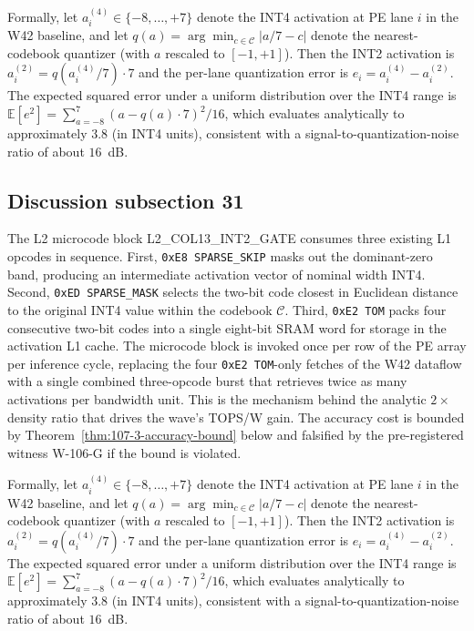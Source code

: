 Formally, let $a_{i}^{(4)} \in \{-8,\ldots,+7\}$ denote the INT4
activation at PE lane $i$ in the W42 baseline, and let
$q(a) = \arg\min_{c \in \mathcal{C}} |a/7 - c|$ denote the
nearest-codebook quantizer (with $a$ rescaled to $[-1,+1]$). Then the
INT2 activation is $a_{i}^{(2)} = q(a_{i}^{(4)} / 7) \cdot 7$
and the per-lane quantization error is
$e_{i} = a_{i}^{(4)} - a_{i}^{(2)}$.
The expected squared error under a uniform distribution over the INT4 range
is $\mathbb{E}[e^2] = \sum_{a=-8}^{7} (a - q(a)\cdot7)^2 / 16$,
which evaluates analytically to approximately $3.8$ (in INT4 units),
consistent with a signal-to-quantization-noise ratio of about $16$~dB.


\subsection{Discussion subsection 31}

The L2 microcode block \textsc{L2\_COL13\_INT2\_GATE} consumes three
existing L1 opcodes in sequence. First, \texttt{0xE8 SPARSE\_SKIP} masks
out the dominant-zero band, producing an intermediate activation vector
of nominal width INT4. Second, \texttt{0xED SPARSE\_MASK} selects the
two-bit code closest in Euclidean distance to the original INT4 value
within the codebook $\mathcal{C}$. Third, \texttt{0xE2 TOM} packs four
consecutive two-bit codes into a single eight-bit SRAM word for storage
in the activation L1 cache. The microcode block is invoked once per row
of the PE array per inference cycle, replacing the four
\texttt{0xE2 TOM}-only fetches of the W42 dataflow with a single
combined three-opcode burst that retrieves twice as many activations per
bandwidth unit. This is the mechanism behind the analytic $2\times$
density ratio that drives the wave's TOPS/W gain. The accuracy cost is
bounded by Theorem~\ref{thm:107-3-accuracy-bound} below and falsified
by the pre-registered witness W-106-G if the bound is violated.

Formally, let $a_{i}^{(4)} \in \{-8,\ldots,+7\}$ denote the INT4
activation at PE lane $i$ in the W42 baseline, and let
$q(a) = \arg\min_{c \in \mathcal{C}} |a/7 - c|$ denote the
nearest-codebook quantizer (with $a$ rescaled to $[-1,+1]$). Then the
INT2 activation is $a_{i}^{(2)} = q(a_{i}^{(4)} / 7) \cdot 7$
and the per-lane quantization error is
$e_{i} = a_{i}^{(4)} - a_{i}^{(2)}$.
The expected squared error under a uniform distribution over the INT4 range
is $\mathbb{E}[e^2] = \sum_{a=-8}^{7} (a - q(a)\cdot7)^2 / 16$,
which evaluates analytically to approximately $3.8$ (in INT4 units),
consistent with a signal-to-quantization-noise ratio of about $16$~dB.


